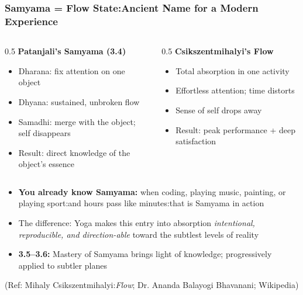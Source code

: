 \begin{frame}[fragile]\frametitle{Samyama = Flow State:Ancient Name for a Modern Experience}

\begin{columns}
\begin{column}[t]{0.5\linewidth}
\textbf{Patanjali's Samyama (3.4)}
\begin{itemize}
\item Dharana: fix attention on one object
\item Dhyana: sustained, unbroken flow
\item Samadhi: merge with the object; self disappears
\item Result: direct knowledge of the object's essence
\end{itemize}
\end{column}
\begin{column}[t]{0.5\linewidth}
\textbf{Csikszentmihalyi's Flow}
\begin{itemize}
\item Total absorption in one activity
\item Effortless attention; time distorts
\item Sense of self drops away
\item Result: peak performance + deep satisfaction
\end{itemize}
\end{column}
\end{columns}

\vspace{3mm}
\begin{itemize}
\item \textbf{You already know Samyama:} when coding, playing music, painting, or playing sport:and hours pass like minutes:that is Samyama in action
\item The difference: Yoga makes this entry into absorption \emph{intentional, reproducible, and direction-able} toward the subtlest levels of reality
\item \textbf{3.5–3.6:} Mastery of Samyama brings light of knowledge; progressively applied to subtler planes
\end{itemize}

\tiny{(Ref: Mihaly Csikszentmihalyi:\emph{Flow}; Dr. Ananda Balayogi Bhavanani; Wikipedia)}

\end{frame}

